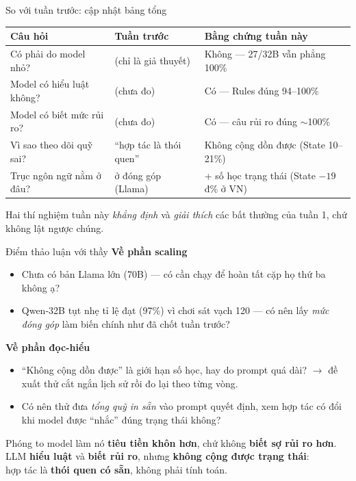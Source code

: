 \documentclass[aspectratio=169,11pt]{beamer}
\newcommand{\take}[1]{\vfill{\footnotesize\color{deepteal}#1}}
\begin{document}
\begin{frame}{So với tuần trước: cập nhật bảng tổng}
  \centering\small
  \begin{tabular}{lll}
    \toprule
    Câu hỏi & Tuần trước & Bằng chứng tuần này \\
    \midrule
    Có phải do model nhỏ?      & (chỉ là giả thuyết) & \alert{Không} --- 27/32B vẫn phẳng 100\% \\
    Model có hiểu luật không?  & (chưa đo)           & \alert{Có} --- Rules đúng 94--100\% \\
    Model có biết mức rủi ro?  & (chưa đo)           & \alert{Có} --- câu rủi ro đúng $\sim$100\% \\
    Vì sao theo dõi quỹ sai?   & ``hợp tác là thói quen'' & \alert{Không cộng dồn được} (State 10--21\%) \\
    Trục ngôn ngữ nằm ở đâu?   & ở đóng góp (Llama)  & + \alert{số học trạng thái} (State $-19$đ\% ở VN) \\
    \bottomrule
  \end{tabular}
  \take{Hai thí nghiệm tuần này \emph{khẳng định} và \emph{giải thích} các bất thường của tuần 1, chứ không lật ngược chúng.}
\end{frame}

\begin{frame}{Điểm thảo luận với thầy}
  \textbf{Về phần scaling}
  \begin{itemize}
    \item Chưa có bản Llama lớn (70B) --- có cần chạy để hoàn tất cặp họ thứ ba không ạ?
    \item Qwen-32B tụt nhẹ tỉ lệ đạt (97\%) vì chơi sát vạch 120 --- có nên lấy \emph{mức đóng góp} làm biến chính như đã chốt tuần trước?
  \end{itemize}
  \textbf{Về phần đọc-hiểu}
  \begin{itemize}
    \item ``Không cộng dồn được'' là giới hạn số học, hay do prompt quá dài? $\to$ đề xuất thử cắt ngắn lịch sử rồi đo lại theo từng vòng.
    \item Có nên thử đưa \emph{tổng quỹ in sẵn} vào prompt quyết định, xem hợp tác có đổi khi model được ``nhắc'' đúng trạng thái không?
  \end{itemize}
\end{frame}

\begin{frame}[standout]
  Phóng to model làm nó \textbf{tiêu tiền khôn hơn}, chứ không \textbf{biết sợ rủi ro hơn}. \\[2mm]
  LLM \textbf{hiểu luật} và \textbf{biết rủi ro}, nhưng \textbf{không cộng được trạng thái}: \\
  hợp tác là \textbf{thói quen có sẵn}, không phải tính toán.
\end{frame}
\end{document}
